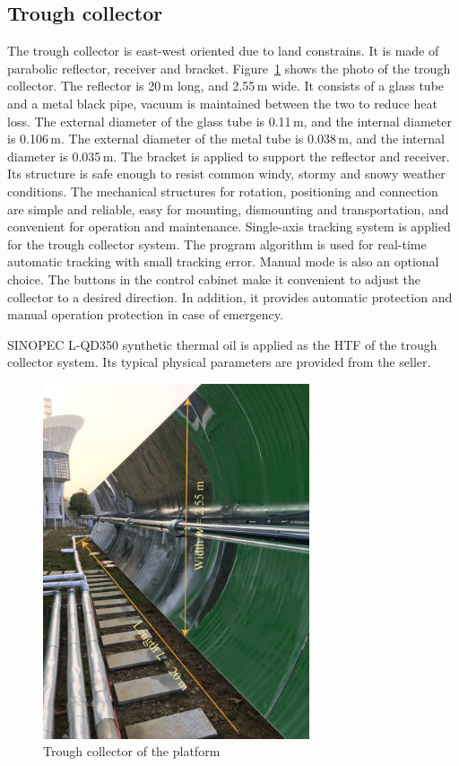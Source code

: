 \subsection{Trough collector}
The trough collector is east-west oriented due to land constrains. It is made of parabolic reflector, receiver and bracket. Figure~\ref{fig:TroughCollector} shows the photo of the trough collector. The reflector is 20$\,\mathrm{m}$ long, and 2.55$\,\mathrm{m}$ wide. It consists of a glass tube and a metal black pipe, vacuum is maintained between the two to reduce heat loss. 
The external diameter of the glass tube is 0.11$\,\mathrm{m}$, and the internal diameter is 0.106$\,\mathrm{m}$.
The external diameter of the metal tube is 0.038$\,\mathrm{m}$, and the internal diameter is 0.035$\,\mathrm{m}$.
The bracket is applied to support the reflector and receiver. Its structure is safe enough to resist common windy, stormy and snowy weather conditions. The mechanical structures for rotation, positioning and connection are simple and reliable, easy for mounting, dismounting and transportation, and convenient for operation and maintenance.
Single-axis tracking system is applied for the trough collector system. The program algorithm is used for real-time automatic tracking with small tracking error. Manual mode is also an optional choice. The buttons in the control cabinet make it convenient to adjust the collector to a desired direction. In addition, it provides automatic protection and manual operation protection in case of emergency.

SINOPEC L-QD350 synthetic thermal oil is applied as the HTF of the trough collector system. Its typical physical parameters are provided from the seller.

\begin{figure}[!ht]
\centering
\includegraphics[width=0.7\textwidth]{fig/TroughCollector.jpg}
\caption{Trough collector of the platform}\label{fig:TroughCollector}
\end{figure}

